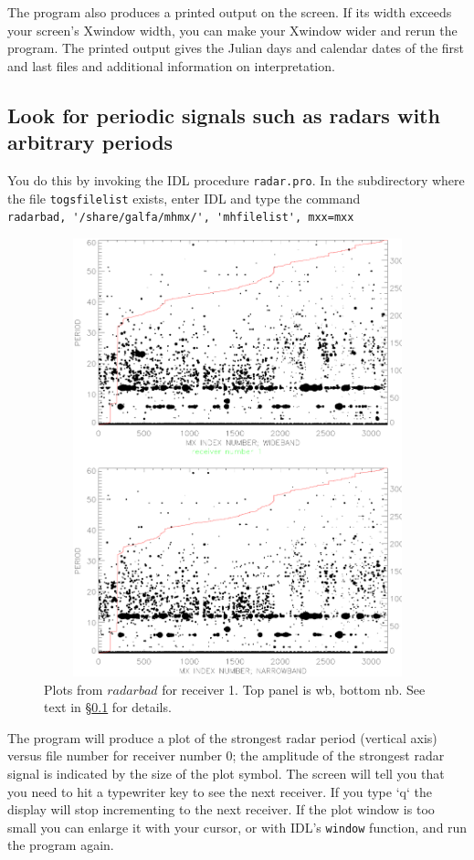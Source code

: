 \documentclass[psfig,preprint]{aastex}
\begin{document}
	The program also produces a printed output on the screen. If its
width exceeds your screen's Xwindow width, you can make your Xwindow
wider and rerun the program. The printed output gives the Julian days
and calendar dates of the first and last files and additional information
on interpretation. 

\subsection{Look for periodic signals such as radars with arbitrary periods}
\label{radarbad}

	You do this by invoking the IDL procedure \verb$radar.pro$.
In the subdirectory where the file \verb$togsfilelist$ exists, enter IDL 
and type the command \\
\verb$radarbad, '/share/galfa/mhmx/', 'mhfilelist', mxx=mxx$ 

\begin{figure}[!h]
\begin{center}
\includegraphics[height=5in,width=7in]{radarbad.ps}
\end{center}
\caption{Plots from $radarbad$ for receiver 1. 
Top panel is wb, bottom nb. See text in \S \ref{radarbad}
for details. \label{radarbadps}}
\end{figure}

	The program will produce a plot of the strongest radar period
(vertical axis) versus file number for receiver number 0; the amplitude
of the strongest radar signal is indicated by the size of the plot
symbol.  The screen will tell you that you need to hit a typewriter key
to see the next receiver.  If you type `q` the display will stop
incrementing to the next receiver.  If the plot window is too small you
can enlarge it with your cursor, or with IDL's \verb$window$ function,
and run the program again. 
\end{document}
